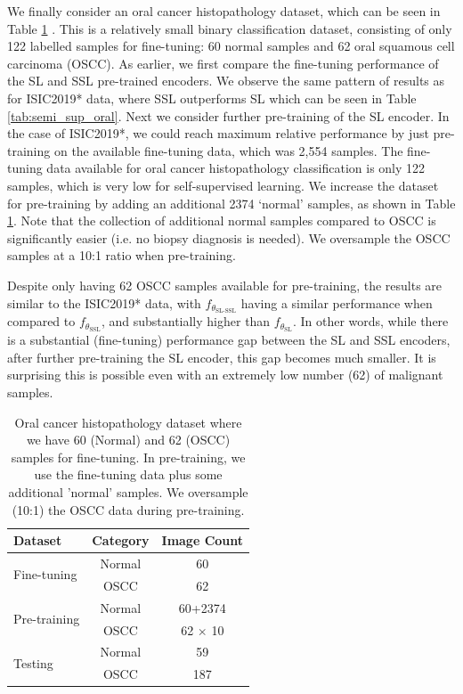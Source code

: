 \documentclass[a4paper,fleqn]{cas-dc}
\begin{document}

We finally consider an oral cancer histopathology dataset, which can be seen in Table \ref{tab:oral_cancer_data} \cite{fasilkebede2023oral}. This is a relatively small binary classification dataset, consisting of only 122 labelled samples for fine-tuning: 60 normal samples and 62 oral squamous cell carcinoma (OSCC). As earlier, we first compare the fine-tuning performance of the SL and SSL pre-trained encoders. We observe the same pattern of results as for ISIC2019* data, where SSL outperforms SL which can be seen in Table \ref{tab:semi_sup_oral}. Next we consider further pre-training of the SL encoder. In the case of ISIC2019*, we could reach maximum relative performance by just pre-training on the available fine-tuning data, which was 2,554 samples. The fine-tuning data available for oral cancer histopathology classification is only 122 samples, which is very low for self-supervised learning. We increase the dataset for pre-training by adding an additional 2374 `normal' samples, as shown in Table \ref{tab:oral_cancer_data}. Note that the collection of additional normal samples compared to OSCC is significantly easier (i.e. no biopsy diagnosis is needed). We oversample the OSCC samples at a 10:1 ratio when pre-training.

Despite only having 62 OSCC samples available for pre-training, the  results are similar to the ISIC2019* data, with $f_{\theta_{\scriptscriptstyle\text{SL-SSL}}}$ having a similar performance when compared to $f_{\theta_{\scriptscriptstyle\text{SSL}}}$, and substantially higher than $f_{\theta_{\scriptscriptstyle\text{SL}}}$. In other words, while there is a substantial (fine-tuning) performance gap between the SL and SSL encoders, after further pre-training the SL encoder, this gap becomes much smaller. It is surprising this is possible even with an extremely low number (62) of malignant samples.

\begin{table}[H]
\centering
\begin{tabular}{@{}lcc@{}}
\toprule
\textbf{Dataset} & \textbf{Category} & \textbf{Image Count} \\ \midrule
\multirow{2}{*}{Fine-tuning} & Normal & 60 \\
                             & OSCC   & 62 \\ \midrule
\multirow{2}{*}{Pre-training} & Normal   & 60+2374 \\
                             & OSCC   & 62 $\times$ 10 \\ \midrule
\multirow{2}{*}{Testing} & Normal & 59 \\
                         & OSCC   & 187 \\ \bottomrule
\end{tabular}
\caption{Oral cancer histopathology dataset where we have   60 (Normal) and 62 (OSCC) samples for fine-tuning. In pre-training, we use the fine-tuning data plus some additional 'normal' samples. We oversample (10:1) the OSCC data   during pre-training.}
\label{tab:oral_cancer_data}
\end{table}
\end{document}
